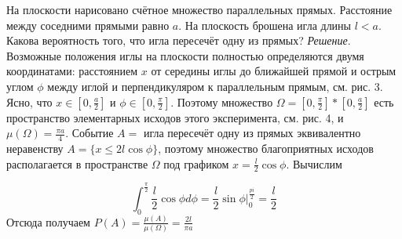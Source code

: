 \begin{example}
На плоскости нарисовано счётное множество параллельных прямых. Расстояние между соседними прямыми равно $a$. На плоскость брошена игла длины $l < a$. Какова вероятность
того, что игла пересечёт одну из прямых?
\textit{Решение}. Возможные положения иглы на плоскости полностью определяются двумя координатами: расстоянием $x$ от середины иглы до ближайшей
прямой и острым углом $\phi$ между иглой и перпендикуляром к параллельным прямым, см. рис. 3. Ясно, что $x \in [0, \frac{a}{2} ]$ и $\phi \in [0, \frac{\pi}{2} ]$. Поэтому множество $\Omega = [0, \frac{\pi}{2}] * [0, \frac{a}{2} ]$ есть пространство элементарных исходов этого эксперимента, см. рис. 4, и $\mu(\Omega) = \frac{\pi a}{4}
.$
Событие $A =$ {игла пересечёт одну из прямых} эквивалентно неравенству
$A = \{x \leq 2{{l}} \cos \phi \}$, поэтому множество благоприятных исходов располагается в пространстве $\Omega$ под графиком $x = \frac{ {{l}}}{2} \cos \phi$. Вычислим

$$\int_{0}^{\frac{\pi}{2}} \frac{{{l}}}{2} \cos \phi d\phi = \frac{{{l}}}{2} \sin \phi \bigg|_0^{\frac{pi}{2}} = \frac{{{l}}}{2}$$
Отсюда получаем $P(A) = \frac{\mu(A)}{\mu(\Omega)}
 = \frac{2{{l}}}{\pi a}$
\end{example}
